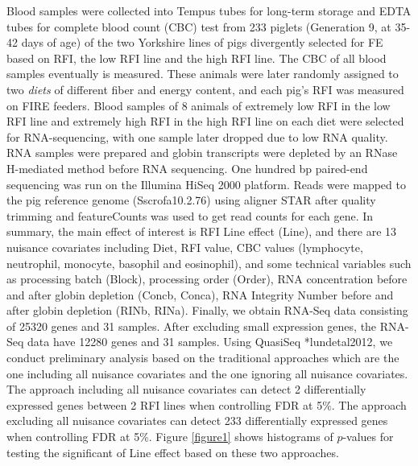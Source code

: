 \documentclass[12pt, letter]{article}\usepackage[]{graphicx}\usepackage[]{color}
\begin{document}
Blood samples were collected into Tempus tubes for long-term storage and EDTA tubes for complete blood count (CBC) test from 233 piglets  (Generation 9, at 35-42 days of age) of the two Yorkshire lines of pigs divergently selected for FE 
based on RFI, the low RFI line and the high RFI line. The CBC of all blood samples eventually is measured. These animals were later randomly assigned to two \emph{diets} of different fiber and energy content, and each pig’s RFI was measured on FIRE feeders. Blood samples of 8 animals of extremely low RFI in the low RFI line and extremely high RFI in the high RFI line on each diet were selected for RNA-sequencing, with one sample later dropped due to low RNA quality. RNA samples were prepared and globin transcripts were depleted by an RNase H-mediated method before RNA 
sequencing. One hundred bp paired-end sequencing was run on the Illumina HiSeq 2000 platform. Reads were mapped to the pig reference genome (Sscrofa10.2.76) using aligner STAR after quality trimming and featureCounts was used to get read 
counts for each gene. In summary, the main effect of interest is RFI Line effect (Line), and there are 13 nuisance covariates including Diet, RFI value, 
CBC values (lymphocyte, neutrophil, monocyte, basophil and eosinophil), and some technical variables such as processing batch (Block), processing order (Order), RNA concentration before and after globin depletion (Concb, Conca), RNA Integrity Number before and after globin depletion (RINb, RINa). Finally, we obtain RNA-Seq data consisting of 25320 genes and 31 samples. After excluding small expression genes, the RNA-Seq data have 12280 genes and 31 samples. 
Using QuasiSeq \citeasnoun**{lundetal2012}, we conduct preliminary analysis based on the traditional approaches which are the one including all nuisance covariates and the one ignoring all nuisance covariates. The approach including all nuisance covariates can detect 2  differentially expressed genes  between 2 RFI lines when controlling FDR at 5\%.  The approach excluding all nuisance covariates can detect  233 differentially expressed genes when controlling FDR at 5\%. Figure \ref{figure1}  shows histograms of $p$-values for testing the significant of Line effect based on these two approaches. 
\end{document}
